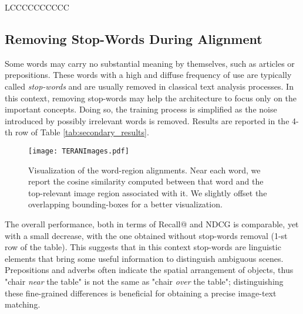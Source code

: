 \documentclass[acmsmall]{acmart}
\begin{document}
\begin{table}[t]
\begin{center}
\begin{tabular}{LCCCCCCCCCC}
\bottomrule
\end{tabular}
\label{tab:secondary_results}
\end{center}
\end{table}

\subsection{Removing Stop-Words During Alignment}
Some words may carry no substantial meaning by themselves, such as articles or prepositions. These words with a high and diffuse frequency of use are typically called \textit{stop-words} and are usually removed in classical text analysis processes. In this context, removing stop-words may help the architecture to focus only on the important concepts. Doing so, the training process is simplified as the noise introduced by possibly irrelevant words is removed.
Results are reported in the 4-th row of Table \ref{tab:secondary_results}.
\begin{figure}[t]
    \centering
    \texttt{[image: TERANImages.pdf]}
  \caption{Visualization of the word-region alignments. Near each word, we report the cosine similarity computed between that word and the top-relevant image region associated with it. We slightly offset the overlapping bounding-boxes for a better visualization.}
\label{fig:alignment_visualization}       \end{figure}
The overall performance, both in terms of Recall@ and NDCG is comparable, yet with a small decrease, with the one obtained without stop-words removal (1-st row of the table). 
This suggests that in this context stop-words are linguistic elements that bring some useful information to distinguish ambiguous scenes. Prepositions and adverbs often indicate the spatial arrangement of objects, thus "chair \textit{near} the table" is not the same as "chair \textit{over} the table"; distinguishing these fine-grained differences is beneficial for obtaining a precise image-text matching.
\end{document}
